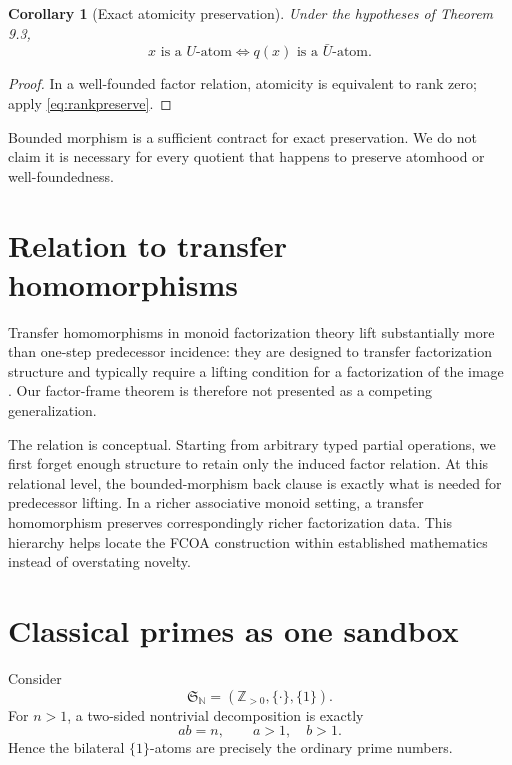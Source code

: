 \documentclass[11pt]{article}
\newtheorem{corollary}[theorem]{Corollary}
\theoremstyle{definition}
\theoremstyle{remark}
\newcommand{\Sbx}{\mathfrak S}
\begin{document}
\begin{corollary}[Exact atomicity preservation]
Under the hypotheses of Theorem 9.3,
\begin{equation}
\boxed{x\text{ is a }U\text{-atom}\iff q(x)\text{ is a }\bar U\text{-atom}.}
\end{equation}
\end{corollary}

\begin{proof}
In a well-founded factor relation, atomicity is equivalent to rank zero; apply \eqref{eq:rankpreserve}.
\end{proof}

Bounded morphism is a sufficient contract for exact preservation. We do not claim it is necessary for every quotient that happens to preserve atomhood or well-foundedness.

\section{Relation to transfer homomorphisms}

Transfer homomorphisms in monoid factorization theory lift substantially more than one-step predecessor incidence: they are designed to transfer factorization structure and typically require a lifting condition for a factorization of the image \cite{GeroldingerHalterKoch2006}. Our factor-frame theorem is therefore not presented as a competing generalization.

The relation is conceptual. Starting from arbitrary typed partial operations, we first forget enough structure to retain only the induced factor relation. At this relational level, the bounded-morphism back clause is exactly what is needed for predecessor lifting. In a richer associative monoid setting, a transfer homomorphism preserves correspondingly richer factorization data. This hierarchy helps locate the FCOA construction within established mathematics instead of overstating novelty.

\section{Classical primes as one sandbox}

Consider
\begin{equation}
\Sbx_{\mathbb N}=(\mathbb Z_{>0},\{\cdot\},\{1\}).
\label{eq:classical}
\end{equation}
For \(n>1\), a two-sided nontrivial decomposition is exactly
\[
a b=n,\qquad a>1,\quad b>1.
\]
Hence the bilateral \(\{1\}\)-atoms are precisely the ordinary prime numbers.
\end{document}
